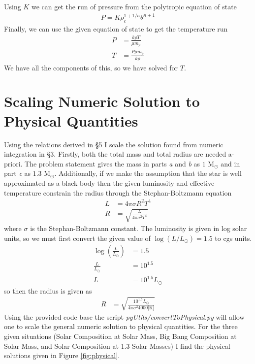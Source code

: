 Using $K$ we can get the run of pressure from the polytropic equation of state
\begin{align*}
    P = K\rho_{c}^{1+1/n}\theta^{n+1}
\end{align*}
Finally, we can use the given equation of state to get the temperature run
\begin{align*}
    P &= \frac{k\rho T}{\mu m_{p}}\\
    T &= \frac{P\mu m_{p}}{k\rho}
\end{align*}
We have all the components of this, so we have solved for $T$.

\section{Scaling Numeric Solution to Physical Quantities}
Using the relations derived in \S 5 I scale the solution found from numeric integration in \S 3. Firstly, both the total mass and total radius are needed a-priori. The problem statement gives the mass in parts \textit{a} and \textit{b} as $1$ M$_{\odot}$ and in part \textit{c} as $1.3$ M$_{\odot}$.  Additionally, if we make the assumption that the star is well approximated as a black body then the given luminosity and effective temperature constrain the radius through the Stephan-Boltzmann equation
\begin{align*}
    L &= 4\pi\sigma R^{2}T^{4} \\
    R &= \sqrt{\frac{L}{4\pi\sigma^{2}T^{4}}}
\end{align*}
where $\sigma$ is the Stephan-Boltzmann constant. The luminosity is given in log solar units, so we must first convert the given value of $\log(L/L_{\odot})=1.5$ to cgs units.
\begin{align*}
    \log(\frac{L}{L_{\odot}}) &= 1.5 \\
    \frac{L}{L_{\odot}} &= 10^{1.5} \\
    L &= 10^{1.5}L_{\odot}
\end{align*}
so then the radius is given as
\begin{align*}
    R &= \sqrt{\frac{10^{1.5}L_{\odot}}{4\pi\sigma^{2}4000\text{[K]}}}
\end{align*}
Using the provided code base the script \textit{pyUtils/convertToPhysical.py} will allow one to scale the general numeric solution to physical quantities. For the three given situations (Solar Composition at Solar Mass, Big Bang Composition at Solar Mass, and Solar Composition at 1.3 Solar Masses) I find the physical solutions given in Figure \ref{fig:physical}.

